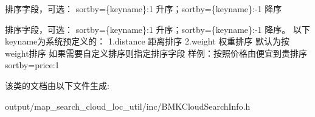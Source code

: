 排序字段，可选： sortby=\{keyname\}\+:1 升序；sortby=\{keyname\}\+:-\/1 降序 

排序字段，可选： sortby=\{keyname\}\+:1 升序；sortby=\{keyname\}\+:-\/1 降序。 以下keyname为系统预定义的： 1.\+distance 距离排序 2.\+weight 权重排序 默认为按weight排序 如果需要自定义排序则指定排序字段 样例：按照价格由便宜到贵排序sortby=price\+:1 

该类的文档由以下文件生成\+:\begin{DoxyCompactItemize}
\item 
output/map\+\_\+search\+\_\+cloud\+\_\+loc\+\_\+util/inc/B\+M\+K\+Cloud\+Search\+Info.\+h\end{DoxyCompactItemize}
